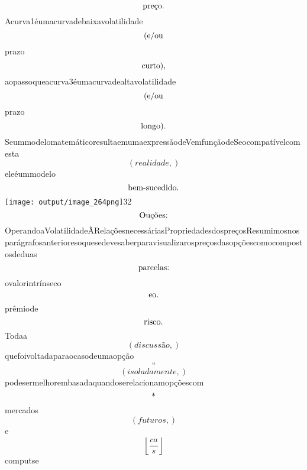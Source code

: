 \documentclass{article}
\begin{document}
\begin{equation}
$preço.$
\end{equation}Acurva1éumacurvadebaixavolatilidade\begin{equation}
$(e/ou$
\end{equation}prazo\begin{equation}
$curto),$
\end{equation}aopassoqueacurva3éumacurvadealtavolatilidade\begin{equation}
$(e/ou$
\end{equation}prazo\begin{equation}
$longo).$
\end{equation}SeummodelomatemáticoresultaemumaexpressãodeVemfunçãodeSeocompatívelcomesta\begin{equation}
\left( realidade,\right)
\end{equation}eleéummodelo\begin{equation}
$bem-sucedido.$
\end{equation}\texttt{[image: output/image\_264png]}32\begin{equation}
$Ouções:$
\end{equation}OperandoaVolatilidadeÃRelaçõesnecessáriasPropriedadesdospreçosResumimosnosparágrafosanterioresoquesedevesaberparavisualizarospreçosdasopçõescomocompostosdeduas\begin{equation}
$parcelas:$
\end{equation}ovalorintrínseco\begin{equation}
$eo.$
\end{equation}prêmiode\begin{equation}
$risco.$
\end{equation}Todaa\begin{equation}
\left( discussão,\right)
\end{equation}quefoivoltadaparaocasodeumaopção\begin{equation}
“
\end{equation}\begin{equation}
\left( isoladamente,\right)
\end{equation}podesermelhorembasadaquandoserelacionamopçõescom\begin{equation}
$*$
\end{equation}mercados\begin{equation}
\left( futuros,\right)
\end{equation}e\begin{equation}
\left\lfloor{\frac{ca}{s}}\right\rfloor
\end{equation}computse\begin{equation}

\end{equation}
\end{document}
